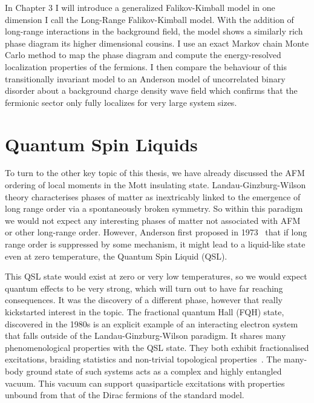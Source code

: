 In Chapter 3 I will introduce a generalized Falikov-Kimball model in one dimension I call the Long-Range Falikov-Kimball model. With the addition of long-range interactions in the background field, the model shows a similarly rich phase diagram its higher dimensional cousins. I use an exact Markov chain Monte Carlo method to map the phase diagram and compute the energy-resolved localization properties of the fermions. I then compare the behaviour of this transitionally invariant model to an Anderson model of uncorrelated binary disorder about a background charge density wave field which confirms that the fermionic sector only fully localizes for very large system sizes.

\hypertarget{quantum-spin-liquids}{%
\section{Quantum Spin Liquids}\label{quantum-spin-liquids}}

To turn to the other key topic of this thesis, we have already discussed the AFM ordering of local moments in the Mott insulating state. Landau-Ginzburg-Wilson theory characterises phases of matter as inextricably linked to the emergence of long range order via a spontaneously broken symmetry. So within this paradigm we would not expect any interesting phases of matter not associated with AFM or other long-range order. However, Anderson first proposed in 1973~\autocite{andersonResonatingValenceBonds1973} that if long range order is suppressed by some mechanism, it might lead to a liquid-like state even at zero temperature, the Quantum Spin Liquid (QSL).

This QSL state would exist at zero or very low temperatures, so we would expect quantum effects to be very strong, which will turn out to have far reaching consequences. It was the discovery of a different phase, however that really kickstarted interest in the topic. The fractional quantum Hall (FQH) state, discovered in the 1980s is an explicit example of an interacting electron system that falls outside of the Landau-Ginzburg-Wilson paradigm. It shares many phenomenological properties with the QSL state. They both exhibit fractionalised excitations, braiding statistics and non-trivial topological properties~\autocite{broholmQuantumSpinLiquids2020}. The many-body ground state of such systems acts as a complex and highly entangled vacuum. This vacuum can support quasiparticle excitations with properties unbound from that of the Dirac fermions of the standard model.


